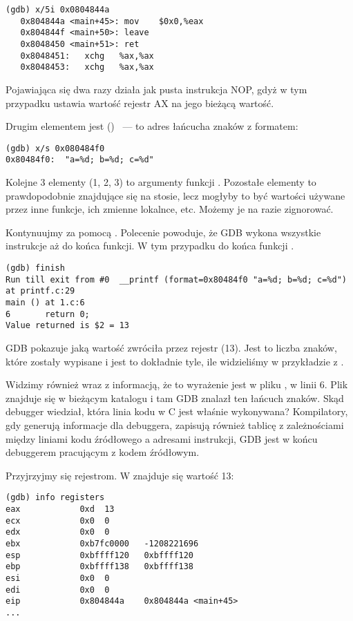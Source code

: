 \begin{lstlisting}[label=NOP_as_XCHG_example,style=customasmx86]
(gdb) x/5i 0x0804844a
   0x804844a <main+45>:	mov    $0x0,%eax
   0x804844f <main+50>:	leave
   0x8048450 <main+51>:	ret
   0x8048451:	xchg   %ax,%ax
   0x8048453:	xchg   %ax,%ax
\end{lstlisting}

Pojawiająca się dwa razy  działa jak pusta instrukcja \ac{NOP}, gdyż w tym przypadku ustawia wartość rejestr AX na jego bieżącą wartość.

Drugim elementem jest () ~--- to adres łańcucha znaków z formatem:

\begin{lstlisting}
(gdb) x/s 0x080484f0
0x80484f0:	"a=%d; b=%d; c=%d"
\end{lstlisting}

Kolejne 3 elementy (1, 2, 3) to argumenty funkcji \printf.
Pozostałe elementy to prawdopodobnie  znajdujące się na stosie,
lecz mogłyby to być wartości używane przez inne funkcje, ich zmienne lokalnce, etc.
Możemy je na razie zignorować.

Kontynuujmy za pomocą .
Polecenie powoduje, że GDB wykona wszystkie instrukcje aż do końca funkcji.
W tym przypadku do końca funkcji \printf.

\begin{lstlisting}
(gdb) finish
Run till exit from #0  __printf (format=0x80484f0 "a=%d; b=%d; c=%d") at printf.c:29
main () at 1.c:6
6		return 0;
Value returned is $2 = 13
\end{lstlisting}

\ac{GDB} pokazuje jaką wartość \printf zwróciła przez rejestr \EAX (13).
Jest to liczba znaków, które zostały wypisane i jest to dokładnie tyle, ile widzieliśmy w przykładzie z \olly.

Widzimy również  wraz z informacją, że to wyrażenie jest w pliku , w linii 6.
Plik  znajduje się w bieżącym katalogu i tam \ac{GDB} znalazł ten łańcuch znaków.
Skąd debugger wiedział, która linia kodu w C jest właśnie wykonywana?
Kompilatory, gdy generują informacje dla debuggera, zapisują również tablicę z zależnościami między liniami kodu źródłowego a adresami instrukcji,
GDB jest w końcu debuggerem pracującym z kodem źródłowym.

Przyjrzyjmy się rejestrom. W \EAX znajduje się wartość 13:

\begin{lstlisting}
(gdb) info registers
eax            0xd	13
ecx            0x0	0
edx            0x0	0
ebx            0xb7fc0000	-1208221696
esp            0xbffff120	0xbffff120
ebp            0xbffff138	0xbffff138
esi            0x0	0
edi            0x0	0
eip            0x804844a	0x804844a <main+45>
...
\end{lstlisting}

